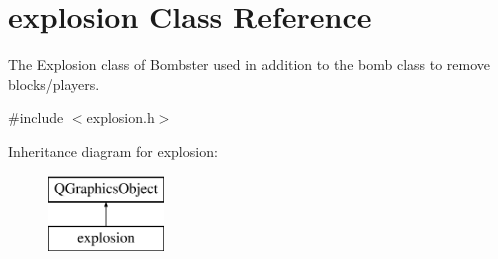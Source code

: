 \hypertarget{classexplosion}{\section{explosion Class Reference}
\label{classexplosion}
}


The Explosion class of Bombster used in addition to the bomb class to remove blocks/players.  




{\ttfamily \#include $<$explosion.\-h$>$}

Inheritance diagram for explosion\-:\begin{figure}[H]
\begin{center}
\leavevmode
\includegraphics[height=2.000000cm]{classexplosion}
\end{center}
\end{figure}
